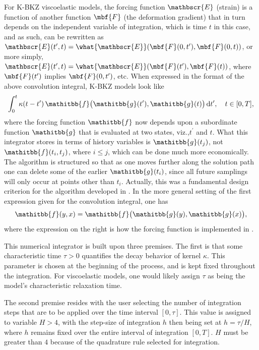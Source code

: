 \documentclass[twocolumn,twoside,fleqn,12pt]{article}
\makeatletter
\renewcommand{\normalfont}{\usefont{T1}{txr}{m}{n}}
\newcommand{\fontss}[1]{\usefont{T1}{txss}{m}{n}{#1}\normalfont}
\renewcommand{\textsf}[1]{\fontss{#1}\xspace}
\newcommand{\viz}{viz.,\xspace}
\newcommand{\etc}{etc.\@\xspace}
\newcommand{\vecMtx}[1]{\ensuremath{\mathitbb{#1}}}
\newcommand{\tenFld}[1]{\ensuremath{\mbf{#1}}}
\makeatother
\begin{document}
For K-BKZ viscoelastic models, the forcing function $\mathbscr{E}$
(strain) is a function of another function $\tenFld{F}$  (the deformation
gradient) that in turn depends on the independent variable of integration,
which is time $t$ in this case, and as such, can be rewritten as $\mathbscr{E}
(t^{\prime},t) = \what{\mathbscr{E}} ( \tenFld{F}(0,t^{\prime}),
\tenFld{F} (0,t))$, or more simply, $\mathbscr{E} (t^{\prime},t) =
\what{\mathbscr{E}} ( \tenFld{F} (t^{\prime}), \tenFld{F}(t))$, where
$\tenFld{F} (t^{\prime})$ implies $\tenFld{F} (0, t^{\prime})$, \etc
When expressed in the format of the above convolution integral,
K-BKZ models look like
\begin{displaymath}
   \int_0^t \kappa (t - t^{\prime}) \, \vecMtx{f} \bigl(
   \vecMtx{g} (t^{\prime}) , \vecMtx{g} (t) \bigr) \, \mathrm{d} t^{\prime},
   \quad t \in [0,T] ,
\end{displaymath}
where the forcing function $\vecMtx{f}$ now depends upon a subordinate function
$\vecMtx{g}$ that is evaluated at two states, \viz $t^{\prime}$ and $t$.  What
this integrator stores in terms of history variables is $\vecMtx{g} (t_j)$,
not $\vecMtx{f} (t_i,t_j)$, where $i \leq j$, which can be done much
more economically.  The algorithm is structured so that as one moves further
along the solution path one can delete some of the earlier $\vecMtx{g} (t_i)$,
since all future samplings will only occur at points other than $t_i$.
Actually, this was a fundamental design criterion for the algorithm
developed in \cite{DiFreed:conv-quad}.  In the more general setting of
the first expression given for the convolution integral, one has
\begin{displaymath}
   \vecMtx{f} (y, x) = \vecMtx{f} \bigl( \vecMtx{g}(y),
   \vecMtx{g}(x) \bigr) ,
\end{displaymath}
where the expression on the right is how the forcing function is
implemented in \textsf{BEL}.

This numerical integrator is built upon three premises. The first is that
some characteristic time $\tau > 0$ quantifies the decay behavior of
kernel $\kappa$.  This parameter is chosen at the beginning of the
process, and is kept fixed throughout the integration.  For visco\-elastic
models, one would likely assign $\tau$ as being the model's characteristic
relaxation time.

The second premise resides with the user selecting the number of
integration steps that are to be applied over the time interval $[0,\tau]$.
This value is assigned to variable $H>4$, with the step-size of integration
$h$ then being set at $h = \tau / H$, where $h$ remains fixed over the
entire interval of integration $[0,T]$.  $H$ must be greater than $4$
because of the quadrature rule selected for integration.
\end{document}

